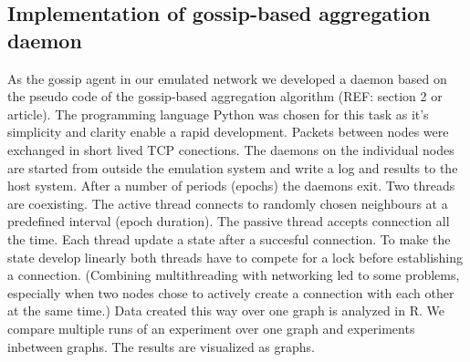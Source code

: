 \documentclass[11pt,a4paper]{article}
\begin{document}
\subsection{Implementation of gossip-based aggregation daemon}
As the gossip agent in our emulated network we developed a daemon based on the pseudo code of the gossip-based aggregation algorithm (REF: section 2 or article). The programming language Python was chosen for this task as it's simplicity and clarity enable a rapid development. Packets between nodes were exchanged in short lived TCP conections. The daemons on the individual nodes are started from outside the emulation system and write a log and results to the host system. After a number of periods (epochs) the daemons exit.
Two threads are coexisting. The active thread connects to randomly chosen neighbours at a predefined interval (epoch duration). The passive thread accepts connection all the time. Each thread update a state after a succesful connection. To make the state develop linearly both threads have to compete for a lock before establishing a connection. (Combining multithreading with networking led to some problems, especially when two nodes chose to actively create a connection with each other at the same time.)
Data created this way over one graph is analyzed in R. We compare multiple runs of an experiment over one graph and experiments inbetween graphs. The results are visualized as graphs.
\end{document}
